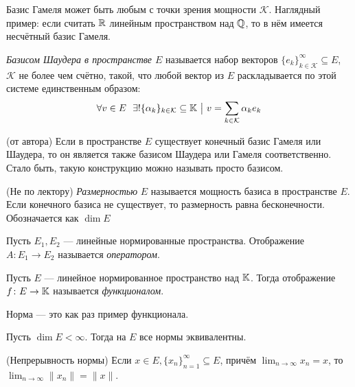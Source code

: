 \begin{anote}
	Базис Гамеля может быть любым с точки зрения мощности $\mathcal{K}$. Наглядный пример: если считать $\mathbb{R}$ линейным пространством над $\mathbb{Q}$, то в нём имеется несчётный базис Гамеля.
\end{anote}

\begin{definition}
	\textit{Базисом Шаудера в пространстве $E$} называется набор векторов $\{e_k\}_{k \in \mathcal{K}}^\infty \subseteq E$, $\mathcal{K}$ не более чем счётно, такой, что любой вектор из $E$ раскладывается по этой системе единственным образом:
	\[
		\forall v \in E\ \ \exists! \{\alpha_k\}_{k \in \mathcal{K}} \subseteq \mathbb{K} \ \big|\  v = \sum_{k \in \mathcal{K}} \alpha_ke_k
	\]
\end{definition}

\begin{proposition} (от автора)
	Если в пространстве $E$ существует конечный базис Гамеля или Шаудера, то он является также базисом Шаудера или Гамеля соответственно. Стало быть, такую конструкцию можно называть просто базисом.
\end{proposition}

\begin{definition} (Не по лектору)
	\textit{Размерностью} $E$ называется мощность базиса в пространстве $E$. Если конечного базиса не существует, то размерность равна бесконечности. Обозначается как $\dim E$
\end{definition}

\begin{definition}
	Пусть $E_1, E_2$ --- линейные нормированные пространства. Отображение $A \colon E_1 \to E_2$ называется \textit{оператором}.
\end{definition}

\begin{definition}
	Пусть $E$ --- линейное нормированное пространство над $\mathbb{K}$. Тогда отображение $f \colon E \to \mathbb{K}$ называется \textit{функционалом}.
\end{definition}

\begin{anote}
	Норма --- это как раз пример функционала.
\end{anote}

\begin{theorem}
	Пусть $\dim E < \infty$. Тогда на $E$ все нормы эквивалентны.
\end{theorem}

\begin{lemma} (Непрерывность нормы)
	Если $x \in E, \{x_n\}_{n = 1}^\infty \subseteq E$, причём $\lim_{n \to \infty} x_n = x$, то $\lim_{n \to \infty} \|x_n\| = \|x\|$.
\end{lemma}


